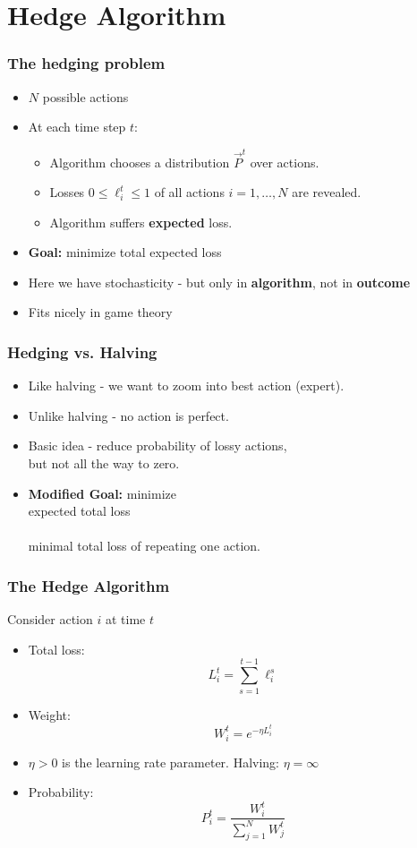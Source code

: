 \documentclass{beamer}
\begin{document}
\section{Hedge Algorithm}

\begin{frame}
\frametitle{The hedging problem}

\begin{itemize}
\item $N$ possible actions 

\item At each time step $t$:
\begin{itemize}
\item Algorithm chooses a distribution $\vec{P}^t$ over actions.
\item Losses $0 \leq \ell_i^t \leq 1$ of all actions $i=1,\ldots,N$ are revealed.
\item Algorithm suffers {\bf expected} loss.
\end{itemize}
\item {{\bf Goal:} minimize total expected loss}
\item {Here we have stochasticity - but only in {\bf algorithm}, not in {\bf outcome}}
\item {Fits nicely in game theory}
\end{itemize}
\end{frame}

\begin{frame}
\frametitle{Hedging vs. Halving}
\begin{itemize}
\item Like halving - we want to zoom into best action (expert).
\item Unlike halving - no action is perfect.
\item Basic idea - reduce probability of lossy actions, \\
but {\color{red}not all the way to zero}.
\item {\bf Modified Goal:}
minimize {\color{red}{difference between}} \\
expected total loss \\
{\color{red}{and}} \\
minimal total loss of repeating one action.
\end{itemize}
\end{frame}

\begin{frame}
\frametitle{The Hedge Algorithm}
Consider action $i$ at time $t$
\begin{itemize}
\item Total loss:
$$L_i^t = \sum_{s=1}^{t-1} \ell_i^s$$
\item Weight:
$$W_i^t = e^{-\eta L_i^t}$$
\item
$\eta>0$ is the learning rate parameter. Halving: $\eta=\infty$ 
\item Probability:
$$P_i^t = \frac{W_i^t}{\sum_{j=1}^N W_j^t} $$
\end{itemize}
\end{frame}
\end{document}
